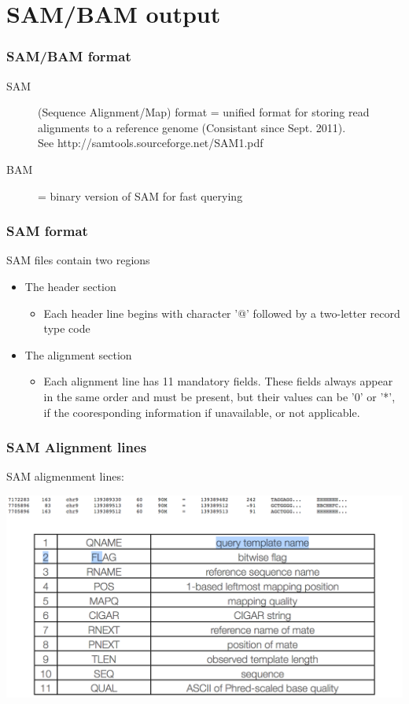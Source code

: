 \documentclass[pdf]{beamer}
\begin{document}
\section{SAM/BAM output}
\begin{frame}
\frametitle{SAM/BAM format}
\begin{description}
\item [SAM] (Sequence Alignment/Map) format = unified format for storing read alignments to a reference genome (Consistant since Sept. 2011).\\
See http://samtools.sourceforge.net/SAM1.pdf
\item [BAM] = binary version of SAM for fast querying
\end{description}
\end{frame}

\begin{frame}
\frametitle{SAM format}
SAM files contain two regions
\begin{itemize}
\item The header section
\begin{itemize}
\item Each header line begins with character '@' followed by a two-letter record type code
\end{itemize}
\item The alignment section
\begin{itemize}
\item Each alignment line has 11 mandatory fields. These fields always appear in the same order and must be present, but their values can be '0' or '*', if the cooresponding information if unavailable, or not applicable.
\end{itemize}
\end{itemize}
\end{frame}

\begin{frame}
\frametitle{SAM Alignment lines}
SAM aligmenment lines:
\begin{center}
\includegraphics[scale=0.25]{Figures/sam.png} 
\end{center}
\end{frame}
\end{document}
